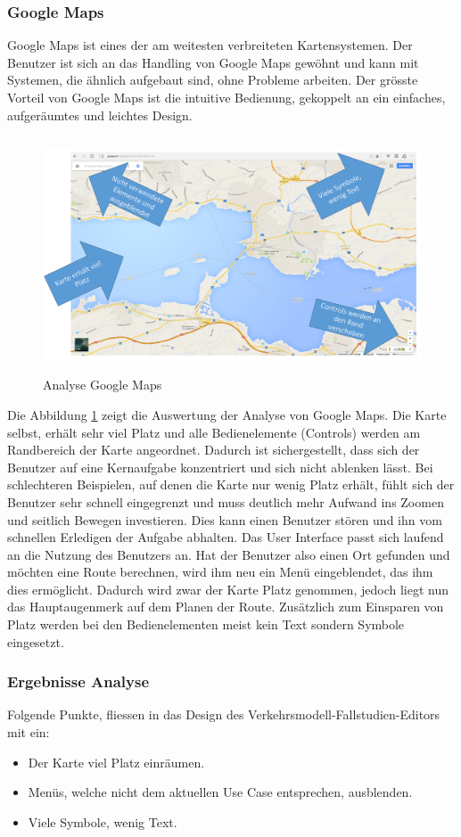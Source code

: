 \subsubsection{Google Maps}
Google Maps ist eines der am weitesten verbreiteten Kartensystemen. Der Benutzer ist sich an das Handling von Google Maps gewöhnt und kann mit Systemen, die ähnlich aufgebaut sind, ohne Probleme arbeiten. Der grösste Vorteil von Google Maps ist die intuitive Bedienung, gekoppelt an ein einfaches, aufgeräumtes und leichtes Design.
\begin{figure}[H]
\centering
\includegraphics[height=7cm]{images/AnalyseGoogle.png}
\caption{Analyse Google Maps}
\label{fig:googlemaps}
\end{figure}
\noindent
Die Abbildung \ref{fig:googlemaps} zeigt die Auswertung der Analyse von Google Maps. Die Karte selbst, erhält sehr viel Platz und alle Bedienelemente (Controls) werden am Randbereich der Karte angeordnet. Dadurch ist sichergestellt, dass sich der Benutzer auf eine Kernaufgabe konzentriert und sich nicht ablenken lässt. Bei schlechteren Beispielen, auf denen die Karte nur wenig Platz erhält, fühlt sich der Benutzer sehr schnell eingegrenzt und muss deutlich mehr Aufwand ins Zoomen und seitlich Bewegen investieren. Dies kann einen Benutzer stören und ihn vom schnellen Erledigen der Aufgabe abhalten. Das User Interface passt sich laufend an die Nutzung des Benutzers an. Hat der Benutzer also einen Ort gefunden und möchten eine Route berechnen, wird ihm neu ein Menü eingeblendet, das ihm dies ermöglicht. Dadurch wird zwar der Karte Platz genommen, jedoch liegt nun das Hauptaugenmerk auf dem Planen der Route. Zusätzlich zum Einsparen von Platz werden bei den Bedienelementen meist kein Text sondern Symbole eingesetzt.
\subsubsection*{Ergebnisse Analyse}
Folgende Punkte, fliessen in das Design des Verkehrsmodell-Fallstudien-Editors mit ein:
\begin{itemize}
\itemsep0em
\item Der Karte viel Platz einräumen.
\item Menüs, welche nicht dem aktuellen Use Case entsprechen, ausblenden.
\item Viele Symbole, wenig Text.
\end{itemize}
\newpage
